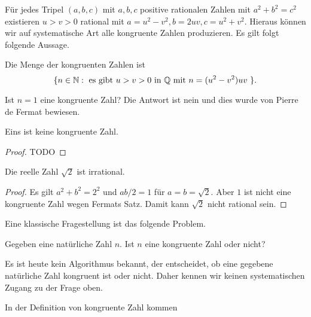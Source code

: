 Für jedes Tripel $(a,b,c)$ mit $a,b,c$ positive rationalen Zahlen mit
$a^2+b^2=c^2$ existieren $u>v>0$ rational mit $a =
u^2-v^2,b=2uv,c=u^2+v^2$. Hieraus können wir auf systematische Art
alle kongruente Zahlen produzieren. Es gilt folgt folgende Aussage.

\begin{lemma}
  Die Menge der kongruenten Zahlen ist
  $$
  \{ n \in {\mathbb{N}} : \text{ es gibt $u>v>0$ in ${\mathbb{Q}}$ mit $n=(u^2-v^2)uv$ }
  \}.
  $$
\end{lemma}


Ist $n=1$ eine kongruente Zahl? Die Antwort ist nein und dies wurde
von Pierre de Fermat bewiesen.

\begin{satz}[Fermat]
  \label{satz:fermat}
  Eins  ist keine kongruente Zahl.
\end{satz}
\begin{proof}
  TODO
\end{proof}

\begin{korollar}
  Die reelle Zahl $\sqrt{2}$ ist irrational. 
\end{korollar}
\begin{proof}
  Es gilt $a^2+b^2=2^2$ und $ab/2=1$ für $a=b=\sqrt 2$. Aber $1$ ist
  nicht eine kongruente Zahl wegen Fermats Satz. Damit kann $\sqrt 2$
  nicht rational sein.
\end{proof}

Eine klassische Fragestellung ist das folgende Problem.

\begin{problem}
  Gegeben eine natürliche Zahl $n$. Ist $n$ eine kongruente Zahl oder
  nicht? 
\end{problem}

Es ist heute kein Algorithmus bekannt, der entscheidet, ob eine
gegebene natürliche Zahl kongruent ist oder nicht. Daher kennen wir
keinen systematischen Zugang zu der Frage oben.

In der Definition von kongruente Zahl kommen 

